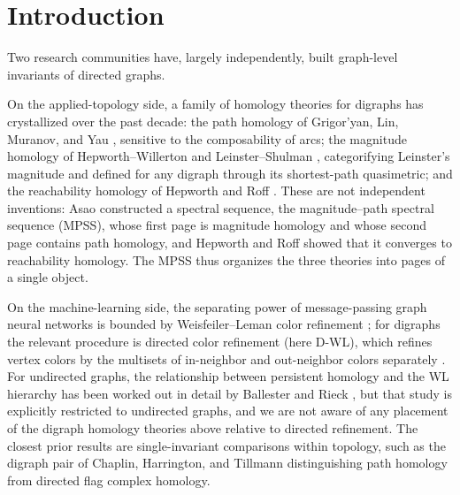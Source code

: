 \documentclass[pdflatex,sn-mathphys,Numbered]{sn-jnl}
\theoremstyle{thmstyleone}
\theoremstyle{thmstyletwo}
\begin{document}

\maketitle

\section{Introduction}\label{sec:intro}

Two research communities have, largely independently, built graph-level
invariants of directed graphs.

On the applied-topology side, a family of homology theories for digraphs
has crystallized over the past decade: the path homology of Grigor'yan,
Lin, Muranov, and Yau \cite{GLMY12,GLMY14}, sensitive to the composability
of arcs; the magnitude homology of Hepworth--Willerton and
Leinster--Shulman \cite{HepworthWillerton17,LeinsterShulman21},
categorifying Leinster's magnitude \cite{Leinster13} and defined for any
digraph through its shortest-path quasimetric; and the reachability
homology of Hepworth and Roff \cite{HepworthRoffIMRN}. These are not
independent inventions: Asao \cite{Asao23} constructed a spectral sequence,
the magnitude--path spectral sequence (MPSS), whose first page is magnitude
homology and whose second page contains path homology, and Hepworth and
Roff \cite{HepworthRoff24,HepworthRoffIMRN} showed that it converges to
reachability homology. The MPSS thus organizes the three theories into
pages of a single object.

On the machine-learning side, the separating power of message-passing
graph neural networks is bounded by Weisfeiler--Leman color refinement
\cite{Xu19,Morris19}; for digraphs the relevant procedure is directed
color refinement (here D-WL), which refines vertex colors by the multisets
of in-neighbor and out-neighbor colors separately \cite{GroheColRef,
Jaume19}. For undirected graphs, the relationship between persistent
homology and the WL hierarchy has been worked out in detail by Ballester
and Rieck \cite{BallesterRieck25}, but that study is explicitly restricted
to undirected graphs, and we are not aware of any placement of the
digraph homology theories above relative to directed refinement. The
closest prior results are single-invariant comparisons within topology,
such as the digraph pair of Chaplin, Harrington, and Tillmann
\cite{ChaplinHT24} distinguishing path homology from directed flag
complex homology.
\end{document}
